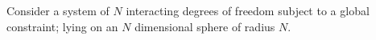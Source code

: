 Consider a system of $N$ interacting degrees of freedom subject to a global constraint; lying on an $N$ dimensional sphere of radius $N$.